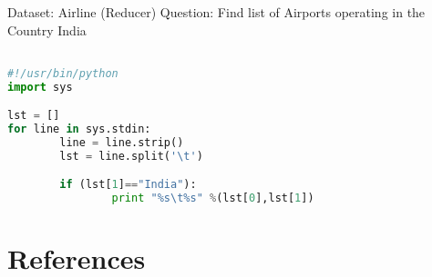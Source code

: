 \documentclass[pdf]{beamer}
\begin{document}
\begin{frame}[fragile]{Dataset: Airline (Reducer)}
Question: Find list of Airports operating in the Country India
\begin{lstlisting}[language=python]

#!/usr/bin/python
import sys

lst = []
for line in sys.stdin:
        line = line.strip()
        lst = line.split('\t')

        if (lst[1]=="India"):
                print "%s\t%s" %(lst[0],lst[1])
\end{lstlisting}
\end{frame}
\section{References}
 

\end{document}
